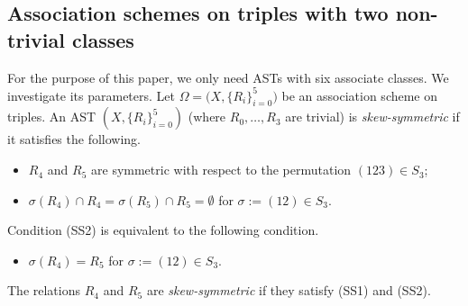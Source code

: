 \documentclass[11pt,oneside]{amsart}
\newcommand{\defn}[1]{\textit{#1}}
\begin{document}
{\subsection{Association schemes on triples with two non-trivial classes}
For the purpose of this paper, we only need ASTs with six associate classes. 
We investigate its parameters. 
Let $\Omega=\big(X,\{R_i\}_{i=0}^5\big)$ be an association scheme on triples. 
An AST $(X,\{R_i\}_{i=0}^5)$ (where $R_0,\dots,R_3$ are trivial) is \defn{skew-symmetric} if 
it satisfies the following.
\begin{itemize}
    \item [(SS1)] $R_4$ and $R_5$ are symmetric with respect to the permutation $(123)\in S_3$;
    \item [(SS2)] $\sigma(R_4) \cap R_4=\sigma(R_5) \cap R_5=\emptyset$ for $\sigma:=(12)\in S_3$.    
\end{itemize} 
Condition (SS2) is equivalent to the following condition. 
\begin{itemize}
    \item [(SS2')] $\sigma(R_4) = R_5$ for $\sigma:=(12)\in S_3$.    
\end{itemize} 
The relations $R_4$ and $R_5$ are \defn{skew-symmetric} if they satisfy (SS1) and (SS2).  

}
\end{document}
